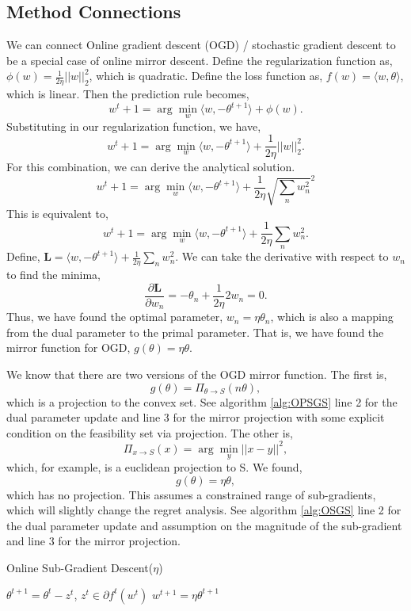 \documentclass[11pt]{article}
\begin{document}
\subsection{Method Connections}
We can connect Online gradient descent (OGD) / stochastic gradient descent to be a special case of online mirror descent.
Define the regularization function as, $\phi(w) = \frac{1}{2\eta} ||w||^2_2$, which is quadratic. Define the loss function as, $f(w) = \langle w, \theta \rangle$, which is linear. Then the prediction rule becomes,
$$
w^t+1 = \arg \min_w \langle w, -\theta^{t+1} \rangle + \phi(w).
$$
Substituting in our regularization function, we have,
$$
w^t+1 = \arg \min_w \langle w, -\theta^{t+1} \rangle + \frac{1}{2\eta} ||w||^2_2.
$$
For this combination, we can derive the analytical solution.
$$
w^t+1 = \arg \min_w \langle w, -\theta^{t+1} \rangle + \frac{1}{2\eta} \sqrt{\sum_n w^2_n}^2
$$
This is equivalent to,
$$
w^t+1 = \arg \min_w \langle w, -\theta^{t+1} \rangle + \frac{1}{2\eta} \sum_n w^2_n.
$$
Define, $\mathbf{L} = \langle w, -\theta^{t+1} \rangle + \frac{1}{2\eta} \sum_n w^2_n$.
We can take the derivative with respect to $w_n$ to find the minima,
$$
\frac{\partial \mathbf{L}}{\partial w_n} = -\theta_n + \frac{1}{2\eta} 2 w_n = 0.
$$
Thus, we have found the optimal parameter, $w_n = \eta \theta_n$, which is also a mapping from the dual parameter to the primal parameter. That is, we have found the mirror function for OGD, $g(\theta) = \eta \theta$.

We know that there are two versions of the OGD mirror function. The first is,
$$
g(\theta) = \Pi_{\theta \to S}(n\theta),
$$
which is a projection to the convex set. See algorithm \ref{alg:OPSGS} line 2 for the dual parameter update and line 3 for the mirror projection with some explicit condition on the feasibility set via projection.
The other is,
$$
\Pi_{x \to S}(x) = \arg \min_y ||x-y||^2,
$$
which, for example, is a euclidean projection to S. We found,
$$
g(\theta) = \eta \theta,
$$
which has no projection. This assumes a constrained range of sub-gradients, which will slightly change the regret analysis. See algorithm \ref{alg:OSGS} line 2 for the dual parameter update and assumption on the magnitude of the sub-gradient and line 3 for the mirror projection.

\begin{algorithm}
\caption{Online Sub-Gradient Descent($\eta$)}
\label{alg:OSGS}
\begin{algorithmic}[1]
        \STATE $\theta^{t+1} = \theta^t - z^t$, $z^t \in \partial f^t(w^t)$
        \STATE $w^{t+1} = \eta \theta^{t+1}$
    \ENDFOR
\end{algorithmic}
\end{algorithm}
\end{document}
